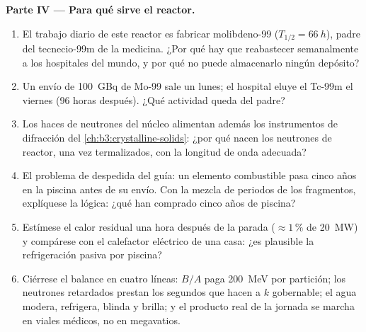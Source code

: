 \begin{problem}
\medskip\noindent\textbf{Parte IV --- Para qué sirve el reactor.}

\begin{enumerate}[resume]
  \item El trabajo diario de este reactor es fabricar molibdeno-99
        ($T_{1/2} = \qty{66}{h}$), padre del
        tecnecio-99m de la medicina. ¿Por qué hay que reabastecer
        semanalmente a los hospitales del mundo, y por qué no puede almacenarlo ningún depósito?
  \item Un envío de \qty{100}{GBq} de Mo-99 sale un lunes; el
        hospital eluye el Tc-99m el viernes (96 horas después). ¿Qué
        actividad queda del padre?
  \item Los haces de neutrones del núcleo alimentan además los instrumentos
        de difracción del \cref{ch:b3:crystalline-solids}: ¿por qué nacen los
        neutrones de reactor, una vez termalizados, con la longitud de onda adecuada?
  \item El problema de despedida del guía: un elemento combustible pasa cinco
        años en la piscina antes de su envío. Con la mezcla de periodos de los
        fragmentos, explíquese la lógica: ¿qué han comprado cinco
        años de piscina?
  \item Estímese el calor residual una hora después de la parada
        ($\approx1\,\%$ de \qty{20}{MW}) y compárese con el
        calefactor eléctrico de una casa: ¿es plausible la refrigeración pasiva
        por piscina?
  \item Ciérrese el balance en cuatro líneas: $B/A$ paga
        \qty{200}{MeV} por partición; los neutrones retardados prestan los
        segundos que hacen a $k$ gobernable; el agua modera,
        refrigera, blinda y brilla; y el producto real de la jornada
        se marcha en viales médicos, no en megavatios.
\end{enumerate}
\end{problem}
